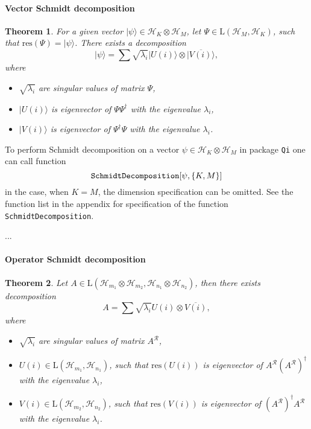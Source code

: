 \documentclass[11pt,a4paper]{article}
\newcommand{\qi}{\texttt{Qi}}
\newcommand{\res}{\mathrm{res}}
\newcommand{\reshuffle}[1]{{#1}^{\mathcal{R}}}
\newcommand{\ket}[1]{\ensuremath{|#1\rangle}}
\newcommand{\Hilb}[1]{\mathcal{H}_{#1}}
\newcommand{\Lin}{\mathrm{L}}
\newcommand{\1}{{\bf 1}}
\newtheorem{theorem}{Theorem}
\begin{document}
\paragraph{Vector Schmidt decomposition}
\begin{theorem} \label{th:Schmidt-Decomposition}
For a given vector  $\ket{\psi} \in \Hilb{K}\otimes \Hilb{M}$,
let $\Psi \in \Lin(\Hilb{M},\Hilb{K})$, such that $\res(\Psi) = \ket{\psi}$.
There exists a decomposition
\begin{equation}
 \ket{\psi} = 
 \sum \sqrt{\lambda_i} \ket{U(i)} \otimes \overline{\ket{V(i)}},
\end{equation}
where 
\begin{itemize}
 \item $\sqrt{\lambda_i}$ are singular values of matrix $\Psi$,
 \item $\ket{U(i)}$ is eigenvector of
$\Psi\Psi^{\dagger}$
 with the eigenvalue $\lambda_i$,
 \item $\ket{V(i)}$ is eigenvector of 
$\Psi^{\dagger} \Psi$
 with the eigenvalue $\lambda_i$.
\end{itemize}
\end{theorem}

To perform Schmidt decomposition on a vector $\psi \in \Hilb{K}\otimes \Hilb{M}$
in package \qi{} one can call function
\begin{equation}
\text{\texttt{SchmidtDecomposition}}[ \psi, \{K,M\}]
\end{equation} 
in the case, when $K=M$, the dimension specification can be omitted. See the
function list in the appendix for specification of the function
\texttt{SchmidtDecomposition}.

...

\paragraph{Operator Schmidt decomposition}
\begin{theorem} \label{th:Operator-Schmidt-Decomposition}
Let $A \in \Lin(\Hilb{m_1}\otimes \Hilb{m_2},\Hilb{n_1}\otimes \Hilb{n_2})$,
then there exists decomposition
\begin{equation}
 A = \sum \sqrt{\lambda_i} U(i) \otimes \overline{V(i)},
\end{equation}
where 
\begin{itemize}
    \item $\sqrt{\lambda_i}$ are singular values of matrix $\reshuffle{A}$,
    \item $U(i) \in \Lin(\Hilb{m_1}, \Hilb{n_1})$, such that $\res(U(i))$ is
    eigenvector of $\reshuffle{A} (\reshuffle{A})^{\dagger}$ with the eigenvalue
    $\lambda_i$,
    \item $V(i) \in \Lin(\Hilb{m_2}, \Hilb{n_2})$, such that $\res(V(i))$ is
    eigenvector of $(\reshuffle{A})^{\dagger} \reshuffle{A}$ with the eigenvalue
    $\lambda_i$.
\end{itemize}
\end{theorem}
\end{document}
